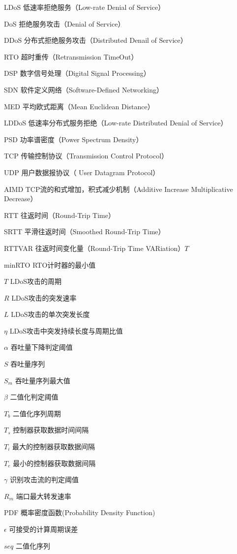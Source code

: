 \begin{denotation}[3cm]
    \item[LDoS] 低速率拒绝服务（Low-rate Denial of Service）
    \item[DoS] 拒绝服务攻击（Denial of Service）
    \item[DDoS] 分布式拒绝服务攻击（Distributed Denail of Service）
    \item[RTO] 超时重传（Retransmission TimeOut）
    \item[DSP] 数字信号处理（Digital Signal Processing）
    \item[SDN] 软件定义网络（Software-Defined Networking）
    \item[MED] 平均欧式距离（Mean Euclidean Distance）
    \item[LDDoS] 低速率分布式服务拒绝（Low-rate Distributed Denial of Service）
    \item[PSD] 功率谱密度（Power Spectrum Density）
    \item[TCP] 传输控制协议（Transmission Control Protocol）
    \item[UDP] 用户数据报协议（ User Datagram Protocol）
    \item[AIMD] TCP流的和式增加，积式减少机制（Additive Increase Multiplicative Decrease）
    \item[RTT]	往返时间（Round-Trip Time）
    \item[SRTT] 平滑往返时间（Smoothed Round-Trip Time）
    \item[RTTVAR] 往返时间变化量（Round-Trip Time VARiation）$T$
    \item[minRTO] RTO计时器的最小值
    \item[$T$] LDoS攻击的周期
    \item[$R$] LDoS攻击的突发速率
    \item[$L$] LDoS攻击的单次突发长度
    \item[$\eta$] LDoS攻击中突发持续长度与周期比值
    \item[$\alpha$] 吞吐量下降判定阈值
    \item[$S$] 吞吐量序列
    \item[$S_m$] 吞吐量序列最大值
    \item[$\beta$] 二值化判定阈值
    \item[$T_b$] 二值化序列周期
    \item[$T_s$] 控制器获取数据时间间隔
    \item[$T_i$] 最大的控制器获取数据间隔
    \item[$T_e$] 最小的控制器获取数据间隔
    \item[$\gamma$] 识别攻击流的判定阈值
    \item[$R_m$] 端口最大转发速率
    \item[PDF] 概率密度函数(Probability Density Function)
    \item[$\epsilon$] 可接受的计算周期误差
    \item[$seq$] 二值化序列

\end{denotation}



